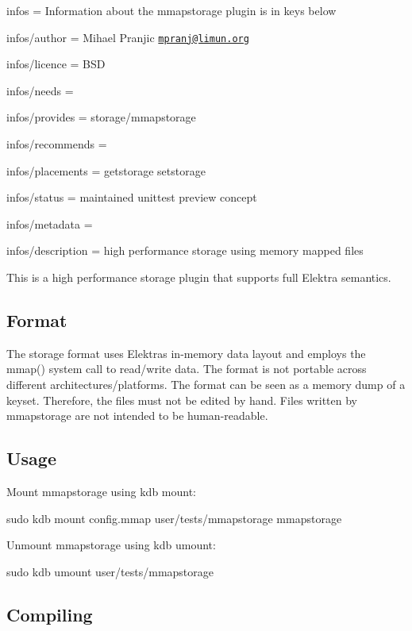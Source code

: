 
\begin{DoxyItemize}
\item infos = Information about the mmapstorage plugin is in keys below
\item infos/author = Mihael Pranjic \href{mailto:mpranj@limun.org}{\tt mpranj@limun.\+org}
\item infos/licence = B\+SD
\item infos/needs =
\item infos/provides = storage/mmapstorage
\item infos/recommends =
\item infos/placements = getstorage setstorage
\item infos/status = maintained unittest preview concept
\item infos/metadata =
\item infos/description = high performance storage using memory mapped files
\end{DoxyItemize}

This is a high performance storage plugin that supports full Elektra semantics.

\subsection*{Format}

The storage format uses Elektra\textquotesingle{}s in-\/memory data layout and employs the {\ttfamily mmap()} system call to read/write data. The format is not portable across different architectures/platforms. The format can be seen as a memory dump of a keyset. Therefore, the files must not be edited by hand. Files written by mmapstorage are not intended to be human-\/readable.

\subsection*{Usage}

Mount mmapstorage using {\ttfamily kdb mount}\+: \begin{DoxyVerb}sudo kdb mount config.mmap user/tests/mmapstorage mmapstorage
\end{DoxyVerb}


Unmount mmapstorage using {\ttfamily kdb umount}\+: \begin{DoxyVerb}sudo kdb umount user/tests/mmapstorage
\end{DoxyVerb}


\subsection*{Compiling}

